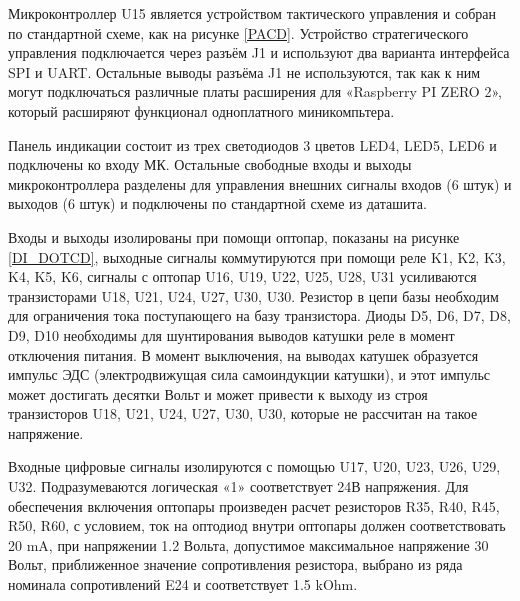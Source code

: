 Микроконтроллер U15 является устройством тактического управления и собран по стандартной схеме, как на рисунке \ref{PACD}.  Устройство стратегического управления подключается через разъём J1 и используют два варианта интерфейса SPI и UART. Остальные выводы разъёма J1 не используются, так как к ним могут подключаться различные платы расширения для «Raspberry PI ZERO 2», который расширяют функционал одноплатного миникомпьтера.

Панель индикации состоит из трех светодиодов 3 цветов LED4, LED5, LED6 и подключены ко входу МК. Остальные свободные входы и выходы микроконтроллера разделены для управления внешних сигналы входов (6 штук) и выходов (6 штук) и подключены по стандартной схеме из даташита. 

Входы и выходы изолированы при помощи оптопар, показаны на рисунке \ref{DI_DOTCD}, выходные сигналы коммутируются при помощи реле K1, K2, K3, K4, K5, K6, сигналы с оптопар U16, U19, U22, U25, U28, U31 усиливаются транзисторами U18, U21, U24, U27, U30, U30. Резистор в цепи базы необходим для ограничения тока поступающего на базу транзистора. Диоды D5, D6, D7, D8, D9, D10 необходимы для шунтирования выводов катушки реле в момент отключения питания. В момент выключения, на выводах катушек образуется импульс ЭДС (электродвижущая сила самоиндукции катушки), и этот импульс может достигать десятки Вольт и может привести к выходу из строя транзисторов U18, U21, U24, U27, U30, U30, которые не рассчитан на такое напряжение. 

Входные цифровые сигналы изолируются с помощью U17, U20, U23, U26, U29, U32.  Подразумеваются логическая «1» соответствует 24В напряжения. Для обеспечения включения оптопары произведен расчет резисторов R35, R40, R45, R50, R60, с условием, ток на оптодиод внутри оптопары должен соответствовать 20 mA, при напряжении 1.2 Вольта, допустимое максимальное напряжение 30 Вольт, приближенное значение сопротивления резистора, выбрано из ряда номинала сопротивлений E24 и соответствует 1.5 kOhm. 